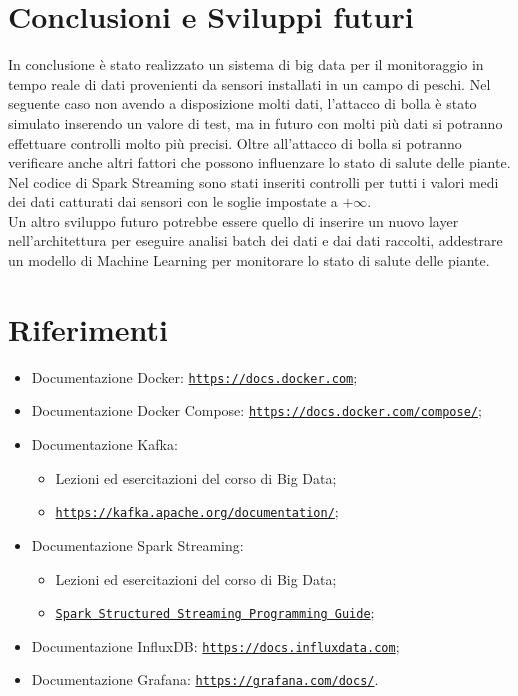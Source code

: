 \documentclass{article}
\begin{document}
\section{Conclusioni e Sviluppi futuri}
In conclusione è stato realizzato un sistema di big data per il monitoraggio in tempo reale di dati provenienti da sensori installati in un campo di peschi. Nel seguente caso non avendo a disposizione molti dati, l'attacco di bolla è stato simulato inserendo un valore di test, ma in futuro con molti più dati si potranno effettuare controlli molto più precisi. Oltre all'attacco di bolla si potranno verificare anche altri fattori che possono influenzare lo stato di salute delle piante. Nel codice di Spark Streaming sono stati inseriti controlli per tutti i valori medi dei dati catturati dai sensori con le soglie impostate a $+\infty$. \\
Un altro sviluppo futuro potrebbe essere quello di inserire un nuovo layer nell'architettura per eseguire analisi batch dei dati e dai dati raccolti, addestrare un modello di Machine Learning per monitorare lo stato di salute delle piante.


\newpage

\section{Riferimenti}
\begin{itemize}
    \item Documentazione Docker: \href{https://docs.docker.com}{\texttt{https://docs.docker.com}};
    \item Documentazione Docker Compose: \href{https://docs.docker.com/compose/}{\texttt{https://docs.docker.com/compose/}};
    \item Documentazione Kafka: 
    \begin{itemize}
    	\item Lezioni ed esercitazioni del corso di Big Data;
    	\item \href{https://kafka.apache.org/documentation/}{\texttt{https://kafka.apache.org/documentation/}};	
    \end{itemize}    
    \item Documentazione Spark Streaming: 
    \begin{itemize}
    	\item Lezioni ed esercitazioni del corso di Big Data;
    	\item \href{https://spark.apache.org/docs/latest/structured-streaming-programming-guide.html}{\texttt{Spark Structured Streaming Programming Guide}};	
    \end{itemize}    
    \item Documentazione InfluxDB: \href{https://docs.influxdata.com}{\texttt{https://docs.influxdata.com}};
    \item Documentazione Grafana: \href{https://grafana.com/docs/}{\texttt{https://grafana.com/docs/}}.
\end{itemize}
\end{document}
